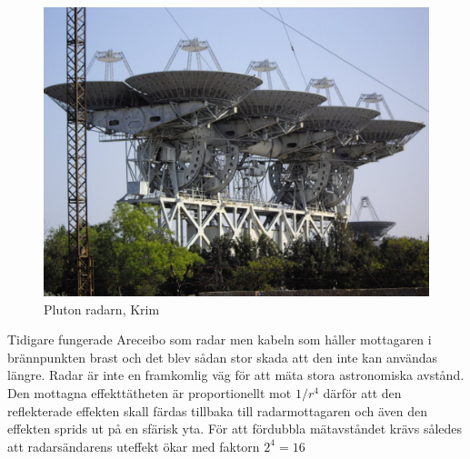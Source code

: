 \documentclass[./exercises.tex]{subfiles}
\begin{document}
 \begin{figure}[H]
\begin{center}
  \includegraphics[scale=0.25]{ADU-1000-4.jpg}
  \caption{Pluton radarn, Krim}
  \end{center}
  \label{fig4}
\end{figure}
Tidigare fungerade Areceibo som radar men kabeln som håller mottagaren i brännpunkten brast och det blev
sådan stor skada att den inte kan användas längre.
Radar är inte en framkomlig väg för att mäta stora astronomiska avstånd. Den mottagna
effekttätheten är proportionellt mot $1/r^4$ därför att den reflekterade effekten skall färdas tillbaka
till radarmottagaren och även den effekten sprids ut på en sfärisk yta. För att fördubbla mätavståndet krävs således att radarsändarens uteffekt
ökar med faktorn $2^4 =16$\\
\end{document}
